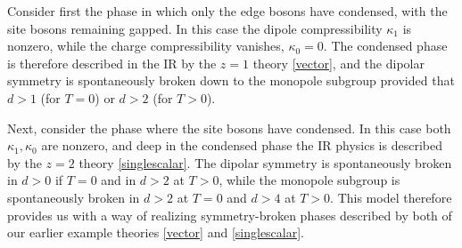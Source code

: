 \documentclass[pra,aps,twocolumn, amsfonts,amsmath,amssymb,nofootinbib,superscriptaddress]{revtex4-2}
\newcommand{\charlie}[1]{\textcolor{Blue}{#1}}
\newcommand{\ethan}[1]{ { \color{blue} \footnotesize \textsf{ethan: \textsl{#1}} }}
\providecommand{\DIFdelbegin}{} %
\providecommand{\DIFdelend}{} %
\newcommand{\DIFscaledelfig}{0.5}
\newlength{\DIFdelgraphicswidth} %
\newlength{\DIFdelgraphicsheight} %
\newcommand{\DIFdelincludegraphics}[2][]{%
\sbox{\DIFdelgraphicsbox}{\DIFOincludegraphics[#1]{#2}}%
\settoboxwidth{\DIFdelgraphicswidth}{\DIFdelgraphicsbox} %
\settoboxtotalheight{\DIFdelgraphicsheight}{\DIFdelgraphicsbox} %
\scalebox{\DIFscaledelfig}{%
\parbox[b]{\DIFdelgraphicswidth}{\usebox{\DIFdelgraphicsbox}\\[-\baselineskip] \rule{\DIFdelgraphicswidth}{0em}}\llap{\resizebox{\DIFdelgraphicswidth}{\DIFdelgraphicsheight}{%
\setlength{\unitlength}{\DIFdelgraphicswidth}%
\begin{picture}(1,1)%
\thicklines\linethickness{2pt} %
{\color[rgb]{1,0,0}\put(0,0){\framebox(1,1){}}}%
{\color[rgb]{1,0,0}\put(0,0){\line( 1,1){1}}}%
{\color[rgb]{1,0,0}\put(0,1){\line(1,-1){1}}}%
\end{picture}%
}\hspace*{3pt}}} %
} %
\DeclareRobustCommand{\DIFdelbegin}{\DIFOdelbegin \let\includegraphics\DIFdelincludegraphics} %
\DeclareRobustCommand{\DIFdelend}{\DIFOaddend \let\includegraphics\DIFOincludegraphics} %
\begin{document}
\DIFdelbegin %

\DIFdelend Consider first the phase in which only the edge bosons have condensed, with the site bosons remaining gapped. In this case the dipole compressibility $\kappa_1$ is nonzero, while the charge compressibility vanishes, $\kappa_0=0$. The condensed phase is therefore described in the IR by the $z=1$ theory \eqref{vector}, and the dipolar symmetry is spontaneously broken down to the monopole subgroup provided that $d>1$ (for $T=0$) or $d>2$ (for $T>0$). 

Next, consider the phase where the site bosons have condensed. In this case both $\kappa_1,\kappa_0$ are nonzero, and deep in the condensed phase the IR physics is described by the $z=2$ theory \eqref{singlescalar}. The dipolar symmetry is spontaneously broken in $d>0$ if $T=0$ and in $d>2$ at $T>0$, while the monopole subgroup is spontaneously broken in $d>2$ at $T=0$ and $d>4$ at $T>0$. This model therefore provides us with a way of realizing symmetry-broken phases described by both of our earlier example theories \eqref{vector} and \eqref{singlescalar}.

\DIFdelbegin %

\end{document}
